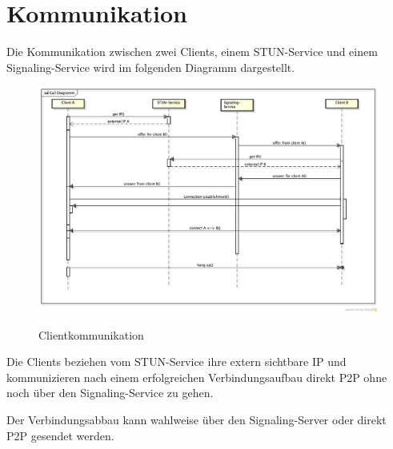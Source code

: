\section{Kommunikation}
	Die Kommunikation zwischen zwei Clients, einem STUN-Service und einem
	Signaling-Service wird im folgenden Diagramm dargestellt.
	\begin{figure}[H]
		\centering
		\includegraphics[width=\textwidth]{../architekturanalayse/img/callDiagramm.png}
		\label{img:deployment}
		\caption{Clientkommunikation}
	\end{figure}
	Die Clients beziehen vom STUN-Service ihre extern sichtbare IP und
	kommunizieren nach einem erfolgreichen Verbindungsaufbau direkt P2P ohne noch
	über den Signaling-Service zu gehen.
	
	Der Verbindungsabbau kann wahlweise über den Signaling-Server oder direkt P2P
	gesendet werden.
	
